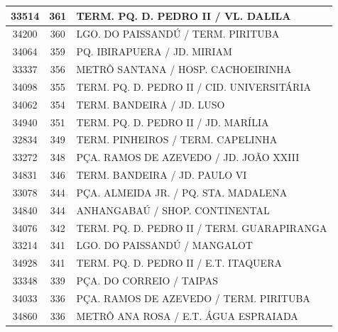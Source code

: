 \documentclass[
	12pt,				%
	oneside,			%
	a4paper,			%
	english,			%
	brazil				%
	]{abntex2ppgsi}
\begin{document}
{{\begin{apendicesenv}
\begin{longtable}{c|c|p{7cm}}
    33514 & 361   & TERM. PQ. D. PEDRO II / VL. DALILA \\
\hline

    34200 & 360   & LGO. DO PAISSANDÚ / TERM. PIRITUBA \\
\hline

    34064 & 359   & PQ. IBIRAPUERA / JD. MIRIAM \\
\hline

    33337 & 356   & METRÔ SANTANA / HOSP. CACHOEIRINHA \\
\hline

    34098 & 355   & TERM. PQ. D. PEDRO II / CID. UNIVERSITÁRIA \\
\hline

    34062 & 354   & TERM. BANDEIRA / JD. LUSO \\
\hline

    34940 & 351   & TERM. PQ. D. PEDRO II / JD. MARÍLIA \\
\hline

    32834 & 349   & TERM. PINHEIROS / TERM. CAPELINHA \\
\hline

    33272 & 348   & PÇA. RAMOS DE AZEVEDO / JD. JOÃO XXIII \\
\hline

    34831 & 346   & TERM. BANDEIRA / JD. PAULO VI \\
\hline

    33078 & 344   & PÇA. ALMEIDA JR. / PQ. STA. MADALENA \\
\hline

    34840 & 344   & ANHANGABAÚ / SHOP. CONTINENTAL \\
\hline

    34076 & 342   & TERM. PQ. D. PEDRO II / TERM. GUARAPIRANGA \\
\hline

    33214 & 341   & LGO. DO PAISSANDÚ / MANGALOT \\
\hline

    34928 & 341   & TERM. PQ. D. PEDRO II / E.T. ITAQUERA \\
\hline

    33348 & 339   & PÇA. DO CORREIO / TAIPAS \\
\hline

    34033 & 336   & PÇA. RAMOS DE AZEVEDO / TERM. PIRITUBA \\
\hline

    34860 & 336   & METRÔ ANA ROSA / E.T. ÁGUA ESPRAIADA \\
\hline


\end{longtable}
\end{apendicesenv}}}
\end{document}
